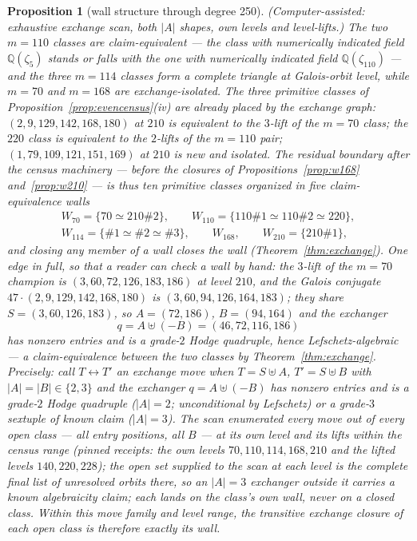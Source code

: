 \documentclass[11pt]{amsart}
\newtheorem{proposition}[theorem]{Proposition}
\theoremstyle{remark}
\newcommand{\Q}{\mathbb{Q}}
\newcommand{\zt}{\zeta}
\begin{document}
\begin{proposition}[wall structure through degree 250]\label{prop:walls}
{\rm(Computer-assisted: exhaustive exchange scan, both $|A|$ shapes, own levels and level-lifts.)}
The two $m=110$ classes are claim-equivalent --- the class with numerically indicated field $\Q(\zt_5)$ stands or falls with
the one with numerically indicated field $\Q(\zt_{110})$ --- and the three $m=114$ classes form a complete triangle at
Galois-orbit level, while $m=70$ and $m=168$ are exchange-isolated. The three primitive classes
of Proposition~\ref{prop:evencensus}(iv) are already placed by the exchange graph:
$(2,9,129,142,168,180)$ at $210$ is equivalent to the $3$-lift of the $m=70$ class; the $220$
class is equivalent to the $2$-lifts of the $m=110$ pair; $(1,79,109,121,151,169)$ at $210$ is
new and isolated. The residual boundary after the census machinery --- before the closures of
Propositions~\ref{prop:w168} and~\ref{prop:w210} --- is thus ten primitive classes organized in
five claim-equivalence walls
\begin{gather*}
W_{70}=\{70\simeq210\#2\},\qquad W_{110}=\{110\#1\simeq110\#2\simeq220\},\\
W_{114}=\{\#1\simeq\#2\simeq\#3\},\qquad W_{168},\qquad W_{210}=\{210\#1\},
\end{gather*}
and closing any member of a wall closes the wall (Theorem~\ref{thm:exchange}). One edge in full,
so that a reader can check a wall by hand: the $3$-lift of the $m=70$ champion is
$(3,60,72,126,183,186)$ at level $210$, and the Galois conjugate $47\cdot(2,9,129,142,168,180)$
is $(3,60,94,126,164,183)$; they share $S=(3,60,126,183)$, so $A=(72,186)$, $B=(94,164)$ and the
exchanger
\[
q=A\uplus(-B)=(46,72,116,186)
\]
has nonzero entries and is a grade-$2$ Hodge quadruple, hence Lefschetz-algebraic --- a
claim-equivalence between the two classes by Theorem~\ref{thm:exchange}. Precisely: call
$T\leftrightarrow T'$ an \emph{exchange move} when $T=S\uplus A$, $T'=S\uplus B$ with
$|A|=|B|\in\{2,3\}$ and the exchanger $q=A\uplus(-B)$ has nonzero entries and is a grade-$2$
Hodge quadruple ($|A|=2$; unconditional by Lefschetz) or a grade-$3$ sextuple of known claim
($|A|=3$). The scan enumerated \emph{every} move out of \emph{every} open class --- all entry
positions, all $B$ --- at its own level and its lifts within the census range (pinned receipts:
the own levels $70,110,114,168,210$ and the lifted levels $140,220,228$); the open set supplied
to the scan at each level is the complete final list of unresolved orbits there, so an $|A|=3$
exchanger outside it carries a known algebraicity claim; each lands on the
class's own wall, never on a closed class. Within this move family and level range, the
transitive exchange closure of each open class is therefore exactly its wall.
\end{proposition}
\end{document}
